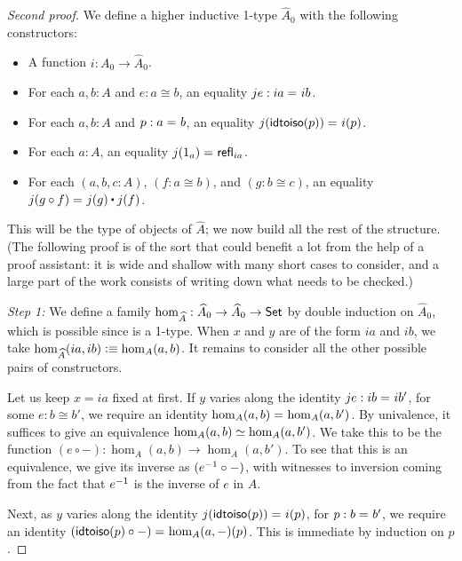 \begin{proof}[Second proof]
  We define a higher inductive 1-type $\widehat A_0$ with the following constructors:
  \begin{itemize}
  \item A function $i:A_0 \to \widehat A_0$.
  \item For each $a,b:A$ and $e:a\cong b$, an equality $je:ia =_{} ib$.
  \item For each $a,b:A$ and $p:a =_{} b$, an equality $j(\mathsf{idtoiso}(p)) =_{} {i}\mathopen{}\left({p}\right)\mathclose{}$.
  \item For each $a:A$, an equality $j(1_a) =_{} \mathsf{refl}_{ia}$.
  \item For each $(a,b,c:A)$, $(f:a\cong b)$, and $(g:b\cong c)$, an equality $\id{j(g \circ f)}{j(g)\ct j(f)}$.
  \end{itemize}
  This will be the type of objects of $\widehat A$; we now build all the rest of the structure.
  (The following proof is of the sort that could benefit a lot from the help of a proof assistant: it is wide and shallow with many short cases to consider, and a large part of the work consists of writing down what needs to be checked.)

  \mentalpause

  \emph{Step 1:} We define a family $\hom_{\widehat A}:\widehat A_0\to \widehat A_0 \to \mathsf{Set}$ by double induction on $\widehat A_0$, which is possible since \set is a 1-type.
  When $x$ and $y$ are of the form $ia$ and $ib$, we take $\hom_{\widehat A}(ia,ib) \vcentcolon\equiv \hom_A(a,b)$.
  It remains to consider all the other possible pairs of constructors.

  Let us keep $x=ia$ fixed at first.
  If $y$ varies along the identity $je:ib =_{} ib'$, for some $e:b\cong b'$, we require an identity $\hom_A(a,b) =_{} \hom_A(a,b')$.
  By univalence, it suffices to give an equivalence $\hom_A(a,b) \simeq \hom_A(a,b')$.
  We take this to be the function $(e\circ -):\hom_A(a,b)\to \hom_A(a,b')$.
  To see that this is an equivalence, we give its inverse as $({e}^{-1}\circ -)$, with witnesses to inversion coming from the fact that ${e}^{-1}$ is the inverse of $e$ in $A$.
  
  Next, as $y$ varies along the identity $j(\mathsf{idtoiso}(p)) =_{} {i}\mathopen{}\left({p}\right)\mathclose{}$, for $p:b =_{} b'$, we require an identity $(\mathsf{idtoiso}(p)\circ -) =_{} {\hom_A(a,-)}\mathopen{}\left({p}\right)\mathclose{}$.
  This is immediate by induction on $p$.


\end{proof}
